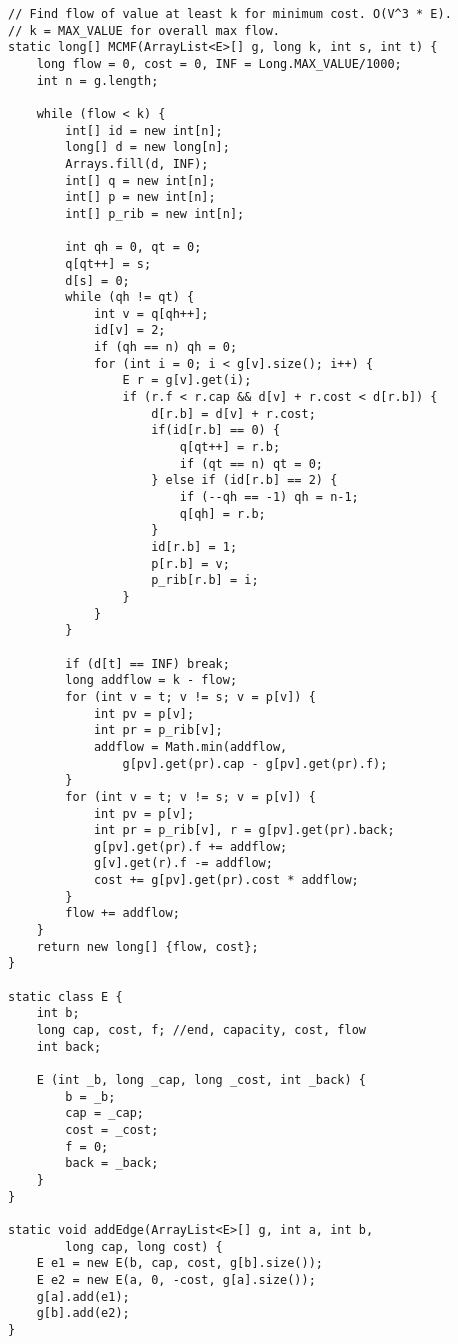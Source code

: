 \begin{verbatim}
// Find flow of value at least k for minimum cost. O(V^3 * E).
// k = MAX_VALUE for overall max flow.
static long[] MCMF(ArrayList<E>[] g, long k, int s, int t) {
	long flow = 0, cost = 0, INF = Long.MAX_VALUE/1000;
	int n = g.length;

	while (flow < k) {
		int[] id = new int[n];
		long[] d = new long[n];
		Arrays.fill(d, INF);
		int[] q = new int[n];
		int[] p = new int[n];
		int[] p_rib = new int[n];

		int qh = 0, qt = 0;
		q[qt++] = s;
		d[s] = 0;
		while (qh != qt) {
			int v = q[qh++];
			id[v] = 2;
			if (qh == n) qh = 0;
			for (int i = 0; i < g[v].size(); i++) {
				E r = g[v].get(i);
				if (r.f < r.cap && d[v] + r.cost < d[r.b]) {
					d[r.b] = d[v] + r.cost;
					if(id[r.b] == 0) {
						q[qt++] = r.b;
						if (qt == n) qt = 0;
					} else if (id[r.b] == 2) {
						if (--qh == -1) qh = n-1;
						q[qh] = r.b;
					}
					id[r.b] = 1;
					p[r.b] = v;
					p_rib[r.b] = i;
				}
			}
		}
			
		if (d[t] == INF) break;
		long addflow = k - flow;
		for (int v = t; v != s; v = p[v]) {
			int pv = p[v];
			int pr = p_rib[v];
			addflow = Math.min(addflow, 
				g[pv].get(pr).cap - g[pv].get(pr).f);
		}
		for (int v = t; v != s; v = p[v]) {
			int pv = p[v];
			int pr = p_rib[v], r = g[pv].get(pr).back;
			g[pv].get(pr).f += addflow;
			g[v].get(r).f -= addflow;
			cost += g[pv].get(pr).cost * addflow;
		}
		flow += addflow;
	}
	return new long[] {flow, cost};
}
	
static class E {
	int b;
	long cap, cost, f; //end, capacity, cost, flow
	int back;
		
	E (int _b, long _cap, long _cost, int _back) {
		b = _b;
		cap = _cap;
		cost = _cost;
		f = 0;
		back = _back;
	}
}
	
static void addEdge(ArrayList<E>[] g, int a, int b, 
		long cap, long cost) {
	E e1 = new E(b, cap, cost, g[b].size());
	E e2 = new E(a, 0, -cost, g[a].size());
	g[a].add(e1);
	g[b].add(e2);
}
\end{verbatim}
